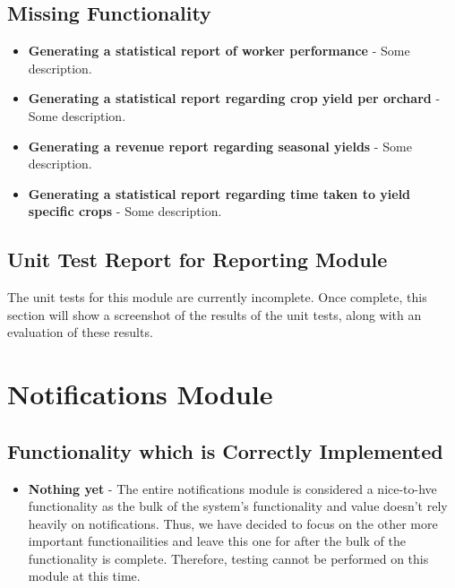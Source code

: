 \documentclass[11pt,fleqn]{book} %
\begin{document}
	\section{Missing Functionality}
		\begin{itemize}
			\item\textbf{Generating a statistical report of worker performance} -
			Some description.
			
			\item\textbf{Generating a statistical report regarding crop yield per orchard} -
			Some description.
			
			\item\textbf{Generating a revenue report regarding seasonal yields} -
			Some description.
			
			\item\textbf{Generating a statistical report regarding time taken to yield specific crops} -
			Some description.
		\end{itemize}
	\section{Unit Test Report for Reporting Module}
		The unit tests for this module are currently incomplete. Once complete, this section will show a screenshot of the results of the unit tests, along with an evaluation of these results.
	


\chapter{Notifications Module}
	\section{Functionality which is Correctly Implemented}
		\begin{itemize}
			\item\textbf{Nothing yet} -
			The entire notifications module is considered a nice-to-hve functionality as the bulk of the system's functionality and value doesn't rely heavily on notifications. Thus, we have decided to focus on the other more important functionailities and leave this one for after the bulk of the functionality is complete. Therefore, testing cannot be performed on this module at this time.
		\end{itemize}
\end{document}

